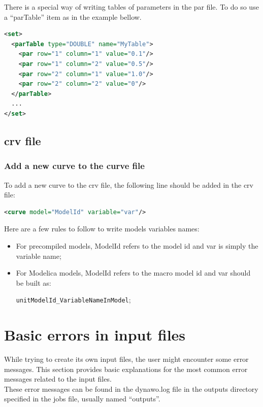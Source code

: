 \documentclass[a4paper, 12pt]{report}
\begin{document}
There is a special way of writing tables of parameters in the par file. To do so use a ``parTable'' item as in the example bellow.
\begin{lstlisting}[language=XML, morekeywords={parTable}]
<set>
  <parTable type="DOUBLE" name="MyTable">
    <par row="1" column="1" value="0.1"/>
    <par row="1" column="2" value="0.5"/>
    <par row="2" column="1" value="1.0"/>
    <par row="2" column="2" value="0"/>
  </parTable>
  ...
</set>
\end{lstlisting}

\subsection{crv file}

\subsubsection{Add a new curve to the curve file}

To add a new curve to the crv file, the following line should be added in the crv file:
\begin{lstlisting}[language=XML,numbers=none]
<curve model="ModelId" variable="var"/>
\end{lstlisting}

Here are a few rules to follow to write models variables names:
\begin{itemize}
\item For precompiled models, ModelId refers to the model id and var is simply the variable name;
\item For Modelica models, ModelId refers to the macro model id and var should be built as:

\verb|unitModelId_VariableNameInModel|;
\end{itemize}

\section{Basic errors in input files}

While trying to create its own input files, the user might encounter some error messages. This section provides basic explanations for the most common error messages related to the input files. \\

These error messages can be found in the dynawo.log file in the outputs directory specified in the jobs file, usually named ``outputs''.
\end{document}
